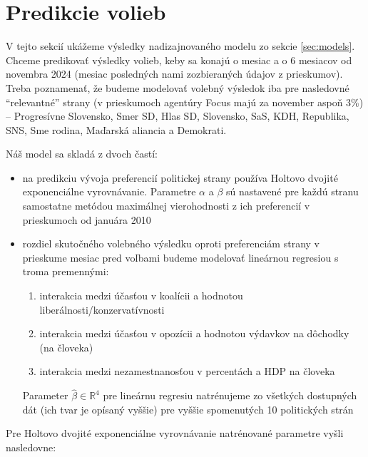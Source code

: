\documentclass[report.tex]{subfiles}
\begin{document}
	
\section{Predikcie volieb}	

V tejto sekcií ukážeme výsledky nadizajnovaného modelu zo sekcie \ref{sec:models}. Chceme predikovať výsledky volieb, keby sa konajú o mesiac a o 6 mesiacov od novembra 2024 (mesiac posledných nami zozbieraných údajov z prieskumov). Treba poznamenať, že budeme modelovať volebný výsledok iba pre nasledovné \enquote{relevantné} strany (v prieskumoch agentúry Focus majú za november aspoň 3\%) --  Progresívne Slovensko, Smer SD, Hlas SD, Slovensko, SaS, KDH, Republika, SNS, Sme rodina, Maďarská aliancia a Demokrati.

Náš model sa skladá z dvoch častí:


\begin{itemize}
	\item na predikciu vývoja preferencií politickej strany používa Holtovo dvojité exponenciálne vyrovnávanie. Parametre $\alpha$ a $\beta$ sú nastavené pre každú stranu samostatne metódou maximálnej vierohodnosti z ich preferencií v prieskumoch od januára 2010 \\
	\item rozdiel skutočného volebného výsledku oproti preferenciám strany v prieskume mesiac pred voľbami budeme modelovať lineárnou regresiou s troma premennými:
	\begin{enumerate}
		\item interakcia medzi účasťou v koalícii a hodnotou liberálnosti/konzervatívnosti
		\item interakcia medzi účasťou v opozícii a hodnotou výdavkov na dôchodky (na človeka)
		\item interakcia medzi nezamestnanosťou v percentách a HDP na človeka
	\end{enumerate}
	Parameter $\hat{\beta} \in \mathbb{R}^4$ pre lineárnu regresiu natrénujeme zo všetkých dostupných dát (ich tvar je opísaný vyššie) pre vyššie spomenutých 10 politických strán
\end{itemize}

Pre Holtovo dvojité exponenciálne vyrovnávanie natrénované parametre vyšli nasledovne:
\end{document}
